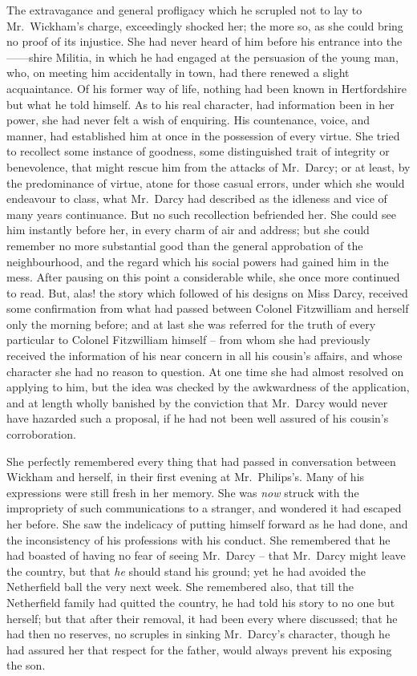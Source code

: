The extravagance and general profligacy which he
scrupled not to lay to Mr.\ Wickham’s charge, exceedingly
shocked her; the more so, as she could bring no proof
of its injustice. She had never heard of him before his
entrance into the \hbox{------shire} Militia, in which he had
engaged at the persuasion of the young man, who, on
meeting him accidentally in town, had there renewed
a slight acquaintance. Of his former way of life, nothing
had been known in Hertfordshire but what he told himself.
As to his real character, had information been in her
power, she had never felt a wish of enquiring. His countenance,
voice, and manner, had established him at once
in the possession of every virtue. She tried to recollect
some instance of goodness, some distinguished trait of
integrity or benevolence, that might rescue him from
the attacks of Mr.\ Darcy; or at least, by the predominance
of virtue, atone for those casual errors, under which she
would endeavour to class, what Mr.\ Darcy had described
as the idleness and vice of many years continuance.
But no such recollection befriended her. She could see
him instantly before her, in every charm of air and address;
but she could remember no more substantial good than
the general approbation of the neighbourhood, and the
regard which his social powers had gained him in the mess.
After pausing on this point a considerable while, she once
more continued to read. But, alas! the story which
followed of his designs on Miss Darcy, received some
confirmation from what had passed between Colonel
Fitzwilliam and herself only the morning before; and at
last she was referred for the truth of every particular to
Colonel Fitzwilliam himself -- from whom she had previously
received the information of his near concern in all his
cousin’s affairs, and whose character she had no reason
to question. At one time she had almost resolved on
applying to him, but the idea was checked by the awkwardness
of the application, and at length wholly banished
by the conviction that Mr.\ Darcy would never have
hazarded such a proposal, if he had not been well assured
of his cousin’s corroboration.

She perfectly remembered every thing that had passed
in conversation between Wickham and herself, in their
first evening at Mr.\ Philips’s. Many of his expressions
were still fresh in her memory. She was \textit{now} struck with
the impropriety of such communications to a stranger,
and wondered it had escaped her before. She saw the
indelicacy of putting himself forward as he had done,
and the inconsistency of his professions with his conduct.
She remembered that he had boasted of having no fear
of seeing Mr.\ Darcy -- that Mr.\ Darcy might leave the
country, but that \textit{he} should stand his ground; yet he
had avoided the Netherfield ball the very next week.
She remembered also, that till the Netherfield family had
quitted the country, he had told his story to no one but
herself; but that after their removal, it had been every
where discussed; that he had then no reserves, no scruples
in sinking Mr.\ Darcy’s character, though he had assured
her that respect for the father, would always prevent his
exposing the son.

